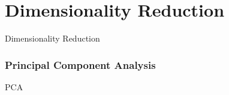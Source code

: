 \section{Dimensionality Reduction}

Dimensionality Reduction

\subsubsection{Principal Component Analysis}

PCA